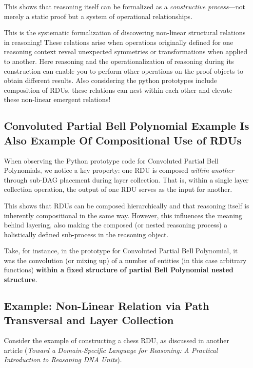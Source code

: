 \documentclass[11pt]{article}
\begin{document}
This shows that reasoning itself can be formalized as a \textit{constructive process}—not merely a static proof but a system of operational relationships. 

This is the systematic formalization of discovering non-linear structural relations in reasoning! These relations arise when operations originally defined for one reasoning context reveal unexpected symmetries or transformations when applied to another. Here reasoning and the operationalization of reasoning during its construction can enable you to perform other operations on the proof objects to obtain different results. Also considering the python prototypes include composition of RDUs, these relations can nest within each other and elevate these non-linear emergent relations!

\subsection*{Convoluted Partial Bell Polynomial Example Is Also Example Of Compositional Use of RDUs}

When observing the Python prototype code for Convoluted Partial Bell Polynomials, we notice a key property: 
one RDU is composed \textit{within another} through sub-DAG placement during layer collection. 
That is, within a single layer collection operation, the output of one RDU serves as the input for another. 

This shows that RDUs can be composed hierarchically and that reasoning itself is inherently compositional in the same way. However, this influences the meaning behind layering, also making the composed (or nested reasoning process) a holistically defined sub-process in the reasoning object. 

Take, for instance, in the prototype for Convoluted Partial Bell Polynomial, it was the convolution (or mixing up) of a number of entities (in this case arbitrary functions) \textbf{within a fixed structure of partial Bell Polynomial nested structure}. 

\subsection*{Example: Non-Linear Relation via Path Transversal and Layer Collection}

Consider the example of constructing a chess RDU, as discussed in another article
(\textit{Toward a Domain-Specific Language for Reasoning: A Practical Introduction to Reasoning DNA Units}).
\end{document}
